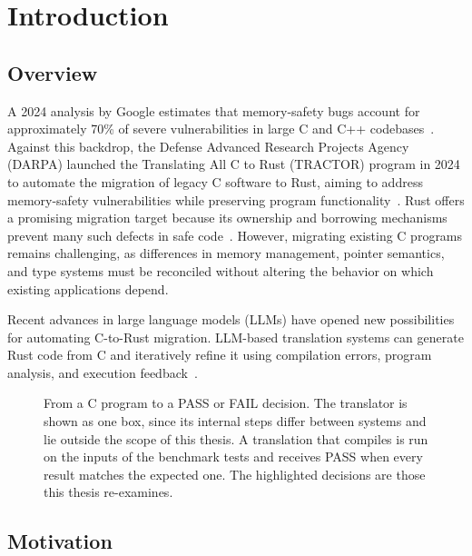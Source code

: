 \chapter{Introduction}\label{ch:introduction}


\section{Overview}\label{sec:intro-background}

A 2024 analysis by Google estimates that memory-safety bugs account for approximately 70\% of severe vulnerabilities in large C and C++ codebases~\cite{rebert2024memorysafety}. Against this backdrop, the Defense Advanced Research Projects Agency (DARPA) launched the Translating All C to Rust (TRACTOR) program in 2024 to automate the migration of legacy C software to Rust, aiming to address memory-safety vulnerabilities while preserving program functionality~\cite{darpa-tractor}. Rust offers a promising migration target because its ownership and borrowing mechanisms prevent many such defects in safe code~\cite{rustreference}. However, migrating existing C programs remains challenging, as differences in memory management, pointer semantics, and type systems must be reconciled without altering the behavior on which existing applications depend.

Recent advances in large language models (LLMs) have opened new possibilities for automating C-to-Rust migration. LLM-based translation systems can generate Rust code from C and iteratively refine it using compilation errors, program analysis, and execution feedback~\cite{nitin2025c2saferrust,shiraishi2026smartc2rust,schesch2026actor}.

\begin{figure}[htbp]
\centering
\resizebox{\linewidth}{!}{}
\caption{From a C program to a PASS or FAIL decision. The translator is shown as one box, since its internal steps differ between systems and lie outside the scope of this thesis. A translation that compiles is run on the inputs of the benchmark tests and receives PASS when every result matches the expected one. The highlighted decisions are those this thesis re-examines.}
\label{fig:intro-workflow}
\end{figure}

\section{Motivation}\label{sec:intro-motivation}

